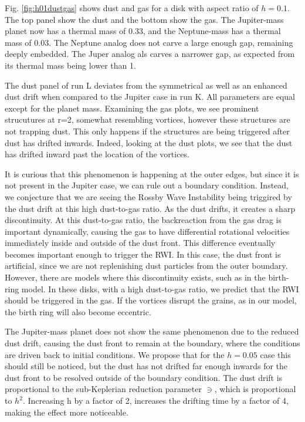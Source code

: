 \documentclass[onecolumn]{report}
\begin{document}
Fig. \ref{fig:h01dustgas} shows dust and gas for a disk with aspect ratio of $h=0.1$. The top panel show the dust and the bottom show the gas. The Jupiter-mass planet now has a thermal mass of 0.33, and the Neptune-mass has a thermal mass of 0.03. The Neptune analog does not carve a large enough gap, remaining deeply embedded. The Juper analog als carves a narrower gap, as expected from its thermal mass being lower than 1.

The dust panel of run L deviates from the symmetrical as well as an enhanced dust drift when compared to the Jupiter case in run K. All parameters are equal except for the planet mass. Examining the gas plots, we see prominent strucutures at r=2, somewhat resembling vortices, however these structures are not trapping dust. This only happens if the structures are being triggered after dust has drifted inwards. Indeed, looking at the dust plots, we see that the dust has drifted inward past the location of the vortices.

It is curious that this phenomenon is happening at the outer edges, but since it is not present in the Jupiter case, we can rule out a boundary condition. Instead, we conjecture that we are seeing the Rossby Wave Instability being triggired by the dust drift at this high dust-to-gas ratio. As the dust drifts, it creates a sharp discontinuity. At this dust-to-gas ratio, the backreaction from the gas drag is important dynamically, causing the gas to have differential rotational velocities immediately inside and outside of the dust front. This difference eventually becomes important enough to trigger the RWI. In this case, the dust front is artificial, since we are not replenishing dust particles from the outer boundary. However, there are models where this discontinuity exists, such as in the birth-ring model. In these disks, with a high dust-to-gas ratio, we predict that the RWI should be triggered in the gas. If the vortices disrupt the grains, as in our model, the birth ring will also become eccentric.

The Jupiter-mass planet does not show the same phenomenon due to the reduced dust drift, causing the dust front to remain at the boundary, where the conditions are driven back to initial conditions. We propose that for the $h=0.05$ case this should still be noticed, but the dust has not drifted far enough inwards for the dust front to be resolved outside of the boundary condition. The dust drift is proportional to the sub-Keplerian reduction parameter $\ni$, which is proportional to $h^2$. Increasing h by a factor of 2, increases the drifting time by a factor of 4, making the effect more noticeable.
\end{document}
